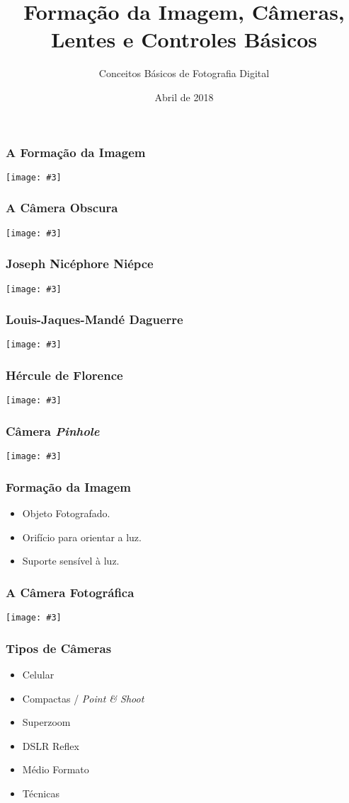 


\subtitle{Conceitos Básicos de Fotografia Digital}
\title{Formação da Imagem, Câmeras, Lentes e Controles Básicos}
\author{}
\date{Abril de 2018}

\newcommand{\oneimage}[3][7cm]{%
    \begin{frame}%
        \frametitle{#2}%
        \begin{center}%
            \texttt{[image: \#3]} %
        \end{center}%
    \end{frame}%
}



\coverframe

\oneimage[6cm]{A Formação da Imagem}{images/olho.jpg}


\oneimage{A Câmera Obscura}{images/pinhole.jpg}

\oneimage{Joseph Nicéphore Niépce}{images/niepce.jpg}

\oneimage{Louis-Jaques-Mandé Daguerre}{images/daguerre.jpg}

\oneimage{Hércule de Florence}{images/florence.jpg}

\oneimage{Câmera \textit{Pinhole}}{images/latamagica.jpg}

\begin{frame}
    \frametitle{Formação da Imagem}
    \begin{itemize}
        \item Objeto Fotografado.
        \item Orifício para orientar a luz.
        \item Suporte sensível à luz.
    \end{itemize}
\end{frame}

\oneimage{A Câmera Fotográfica}{images/basic_camera.jpg}

\begin{frame}
    \frametitle{Tipos de Câmeras}
    \begin{itemize}
        \item Celular
        \item Compactas / \textit{Point \& Shoot}
        \item Superzoom
        \item DSLR Reflex
        \item Médio Formato
        \item Técnicas
    \end{itemize}
\end{frame}

